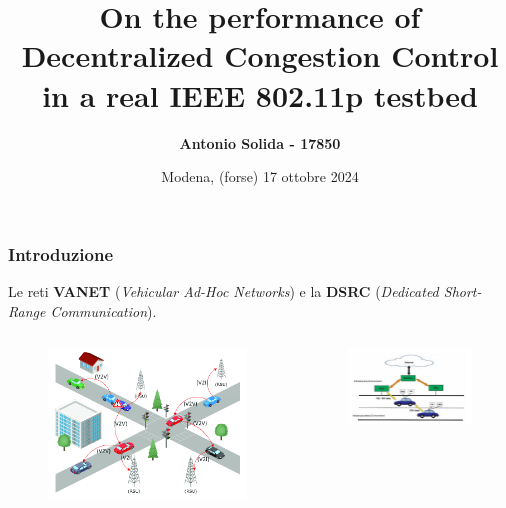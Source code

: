 \documentclass{beamer}
\title[DCC performance in IEEE 802.11p] %
{On the performance of Decentralized Congestion Control in a real IEEE 802.11p testbed}
\author{\textbf{Antonio Solida - 17850}}
\institute[] %
{
    \textbf{Relatore: Prof. Carlo Augusto Grazia}
    \and
    Corso di Laurea Magistrale in Ingegneria Informatica\\
    Percorso "Cloud \& Cybersecurity"\\
    Esame di Automotive Connectivity
    \and
    Dipartimento di Ingegneria "Enzo Ferrari"\\
    Università degli studi di Modena e Reggio Emilia
}
\date[17 ottobre 2024] %
{Modena, (forse) 17 ottobre 2024}
\begin{document}
\frame{\titlepage}

\begin{frame}
\frametitle{Introduzione}
Le reti \textbf{VANET} (\textit{Vehicular Ad-Hoc Networks}) e la \textbf{DSRC} (\textit{Dedicated Short-Range Communication}).
\begin{columns}
    \begin{column}{0.5\textwidth}
        \begin{figure}[h!]
            \centering
            \includegraphics[width=1\textwidth]{vanet.png}
            \label{fig:vanet}
        \end{figure}
    \end{column}
    \begin{column}{0.5\textwidth}
        \begin{figure}[h!]
            \centering
            \includegraphics[width=1\textwidth]{routing_vanet.jpeg}
            \label{fig:obu_rsu}
        \end{figure}
    \end{column}
\end{columns}
\end{frame}
\end{document}
